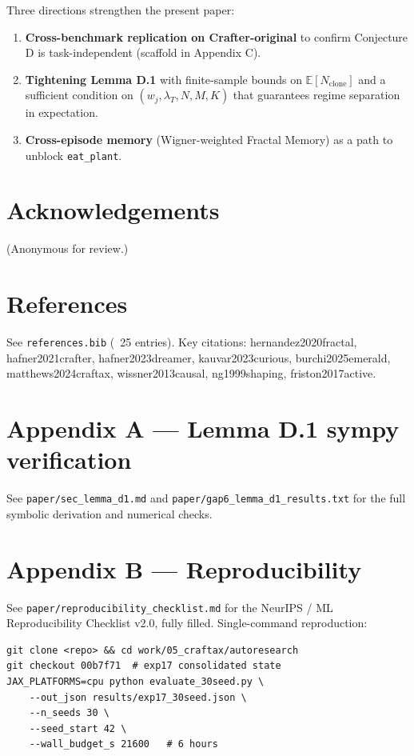 Three directions strengthen the present paper:

\begin{enumerate}
\item \textbf{Cross-benchmark replication on Crafter-original} to confirm Conjecture D is task-independent (scaffold in Appendix C).
\item \textbf{Tightening Lemma D.1} with finite-sample bounds on $\mathbb{E}[N_{\text{clone}}]$ and a sufficient condition on $(w_j, \lambda_T, N, M, K)$ that guarantees regime separation in expectation.
\item \textbf{Cross-episode memory} (Wigner-weighted Fractal Memory) as a path to unblock \texttt{eat\_plant}.
\end{enumerate}
\hrulefill

\section{Acknowledgements}

(Anonymous for review.)

\section{References}

See \texttt{references.bib} (~25 entries). Key citations:
hernandez2020fractal, hafner2021crafter, hafner2023dreamer,
kauvar2023curious, burchi2025emerald, matthews2024craftax,
wissner2013causal, ng1999shaping, friston2017active.

\section{Appendix A — Lemma D.1 sympy verification}

See \texttt{paper/sec\_lemma\_d1.md} and \texttt{paper/gap6\_lemma\_d1\_results.txt} for
the full symbolic derivation and numerical checks.

\section{Appendix B — Reproducibility}

See \texttt{paper/reproducibility\_checklist.md} for the NeurIPS / ML
Reproducibility Checklist v2.0, fully filled. Single-command
reproduction:

\begin{verbatim}
git clone <repo> && cd work/05_craftax/autoresearch
git checkout 00b7f71  # exp17 consolidated state
JAX_PLATFORMS=cpu python evaluate_30seed.py \
    --out_json results/exp17_30seed.json \
    --n_seeds 30 \
    --seed_start 42 \
    --wall_budget_s 21600   # 6 hours
\end{verbatim}

